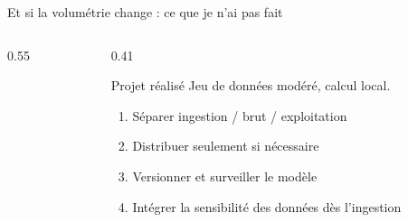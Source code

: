 \begin{frame}{Et si la volumétrie change : ce que je n'ai pas fait}
\begin{columns}[T]
\begin{column}{0.55\linewidth}
\centering
{}
\end{column}
\begin{column}{0.41\linewidth}
\begin{block}{Projet réalisé}
\small Jeu de données modéré, calcul local. 
\end{block}
\small
\begin{enumerate}
  \item Séparer ingestion / brut / exploitation
  \item Distribuer seulement si nécessaire
  \item Versionner et surveiller le modèle
  \item Intégrer la sensibilité des données dès l'ingestion
\end{enumerate}
\vspace{0.2em}
\small{}
\end{column}
\end{columns}
\end{frame}

